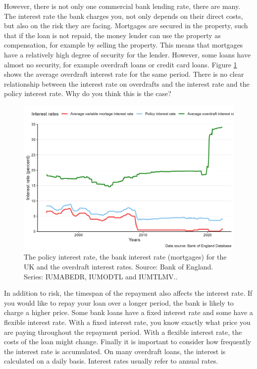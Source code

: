 \documentclass[
]{book}
\begin{document}
However, there is not only one commercial bank lending rate, there are many. The interest rate the bank charges you, not only depends on their direct costs, but also on the risk they are facing. Mortgages are secured in the property, such that if the loan is not repaid, the money lender can use the property as compensation, for example by selling the property. This means that mortgages have a relatively high degree of security for the lender. However, some loans have almost no security, for example overdraft loans or credit card loans.
Figure \ref{fig:money3} shows the average overdraft interest rate for the same period. There is no clear relationship between the interest rate on overdrafts and the interest rate and the policy interest rate. Why do you think this is the case?

\begin{figure}

{\centering \includegraphics[width=0.7\linewidth]{./resources/chapter_money/ex4_1} 

}

\caption{The policy interest rate, the  bank interest rate (mortgages) for the UK and the overdraft interest rates. Source: Bank of England. Series: IUMABEDR, IUMODTL and IUMTLMV..}\label{fig:money3}
\end{figure}

In addition to risk, the timespan of the repayment also affects the interest rate. If you would like to repay your loan over a longer period, the bank is likely to charge a higher price. Some bank loans have a fixed interest rate and some have a flexible interest rate. With a fixed interest rate, you know exactly what price you are paying throughout the repayment period. With a flexible interest rate, the costs of the loan might change. Finally it is important to consider how frequently the interest rate is accumulated. On many overdraft loans, the interest is calculated on a daily basis. Interest rates usually refer to annual rates.
\end{document}
